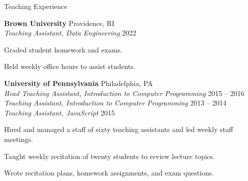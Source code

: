 \documentclass{resume} %
\begin{document}

\begin{grouping}{Teaching Experience}

\item {\bf Brown University } \hfill Providence, RI \\
    {\em Teaching Assistant, Data Engineering} \hfill 2022
    \begin{items}
        \item Graded student homework and exams.
        \item Held weekly office hours to assist students.
    \end{items}

\item {\bf University of Pennsylvania } \hfill Philadelphia, PA \\
    {\em Head Teaching Assistant, Introduction to Computer Programming} \hfill 2015 -- 2016 \\
    {\em Teaching Assistant, Introduction to Computer Programming} \hfill 2013 -- 2014 \\
    {\em Teaching Assistant, JavaScript} \hfill 2015
    \begin{items}
        \item Hired and managed a staff of sixty teaching assistants and led weekly staff meetings.
        \item Taught weekly recitation of twenty students to review lecture topics.
        \item Wrote recitation plans, homework assignments, and exam questions.
    \end{items}

\end{grouping}

\end{document}
